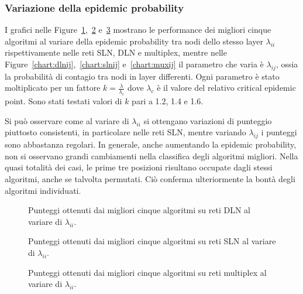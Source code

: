 




\subsubsection{Variazione della epidemic probability}

I grafici nelle Figure~\ref{chart:dlnii},~\ref{chart:slnii} e~\ref{chart:muxii} mostrano le performance dei 
migliori cinque algoritmi al variare della epidemic probability tra nodi dello stesso layer $\lambda_{ii}$ rispettivamente nelle 
reti SLN, DLN e multiplex, mentre nelle Figure~\ref{chart:dlnij},~\ref{chart:slnij} e~\ref{chart:muxij} il parametro 
che varia è $\lambda_{ij}$, ossia
la probabilità di contagio tra nodi in layer differenti.
Ogni parametro è stato moltiplicato per un fattore $k = \frac{\lambda}{\lambda_c}$ dove $\lambda_c$ è il valore del relativo 
critical epidemic point.
Sono stati testati valori di $k$ pari a \num{1.2}, \num{1.4} e \num{1.6}.

Si può osservare come al variare di $\lambda_{ii}$ si ottengano variazioni di punteggio piuttosto consistenti, in particolare nelle 
reti SLN, mentre variando $\lambda_{ij}$ i punteggi sono abbastanza regolari.
In generale, anche aumentando la epidemic probability, non si osservano grandi cambiamenti nella classifica degli algoritmi migliori.
Nella quasi totalità dei casi, le prime tre posizioni risultano occupate dagli stessi algoritmi, anche se talvolta 
permutati. Ciò conferma ulteriormente la bontà degli algoritmi individuati.


\begin{figure}
    \centering
    \resizebox{\textwidth}{!}{}
    
    \caption{Punteggi ottenuti dai migliori cinque algoritmi su reti DLN al variare di $\lambda_{ii}$.}
    \label{chart:dlnii}
\end{figure}

\begin{figure}
    \centering
    \resizebox{\textwidth}{!}{}
    
    \caption{Punteggi ottenuti dai migliori cinque algoritmi su reti SLN al variare di $\lambda_{ii}$.}
    \label{chart:slnii}
\end{figure}

\begin{figure}
    \centering
    \resizebox{\textwidth}{!}{}
    
    \caption{Punteggi ottenuti dai migliori cinque algoritmi su reti multiplex al variare di $\lambda_{ii}$.}
    \label{chart:muxii}
\end{figure}


